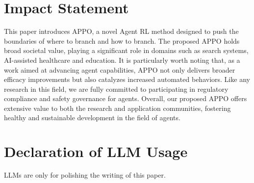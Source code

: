 \documentclass{llmxive}
\begin{document}
\section{Impact Statement}\label{appx:j}
This paper introduces APPO, a novel Agent RL method designed to push the boundaries of where to branch and how to branch. The proposed APPO holds broad societal value, playing a significant role in domains such as search systems, AI-assisted healthcare and education. It is particularly worth noting that, as a work aimed at advancing agent capabilities, APPO not only delivers broader efficacy improvements but also catalyzes increased automated behaviors. Like any research in this field, we are fully committed to participating in regulatory compliance and safety governance for agents. Overall, our proposed APPO offers extensive value to both the research and application communities, fostering healthy and sustainable development in the field of agents.

\section{Declaration of LLM Usage}\label{appx:k}
LLMs are only for polishing the writing of this paper.
 
 
\end{document}
